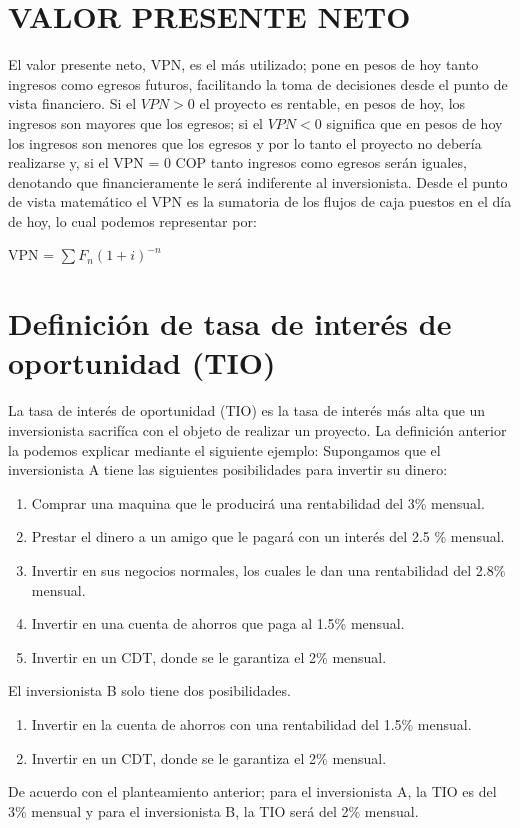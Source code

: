 \section{VALOR PRESENTE NETO}
El valor presente neto, VPN, es el más utilizado; pone en pesos de hoy tanto  ingresos como egresos futuros, facilitando la toma de decisiones desde el punto de vista financiero.
Si el $VPN > 0$ el proyecto es rentable, en pesos de hoy, los ingresos son mayores que los egresos; si el $VPN < 0$ significa que en pesos de hoy los ingresos son menores que los egresos y por lo tanto el proyecto no debería realizarse y, si el VPN = 0 COP tanto ingresos como egresos serán iguales, denotando que financieramente le será indiferente al inversionista.
Desde el punto de vista matemático el VPN es la sumatoria de los flujos de caja puestos en el día de hoy, lo cual podemos representar por:
\begin{center}
	VPN =	$\sum F_{n}(1+i)^{-n}$
\end{center}
\section{Definición de tasa de interés de oportunidad (TIO)}
La tasa de interés de oportunidad (TIO) es la tasa de interés más alta que un inversionista sacrifíca con el objeto de realizar un proyecto.
La definición anterior la podemos explicar mediante el siguiente ejemplo: Supongamos que el inversionista A tiene las siguientes posibilidades para invertir su dinero:
\begin{enumerate}[label=\alph*)]
	\item Comprar una maquina que le producirá una rentabilidad del 3\% mensual.
	\item Prestar el dinero a un amigo que le pagará con un interés del 2.5 \% mensual.
	\item Invertir en sus negocios normales, los cuales le dan una rentabilidad del 2.8\% mensual.
	\item Invertir en una cuenta de ahorros que paga al 1.5\% mensual.
	\item Invertir en un CDT, donde se le garantiza el 2\% mensual.
\end{enumerate}
El inversionista B solo tiene dos posibilidades.
\begin{enumerate}[label=\alph*)]
	\item Invertir en la cuenta de ahorros con una rentabilidad del 1.5\% mensual.
	\item Invertir en un CDT, donde se le garantiza el 2\% mensual.
\end{enumerate}
De acuerdo con el planteamiento anterior; para el inversionista A, la TIO es del 3\% mensual y para el inversionista B, la TIO será del 2\% mensual.
\\
\\


